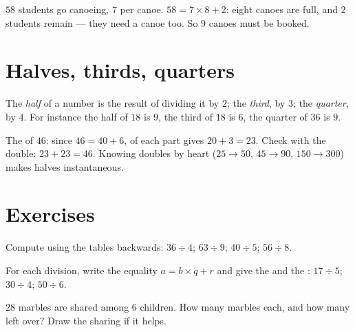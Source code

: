 \begin{example}\label{ex:g3:division:interpret}
$58$ students go canoeing, $7$ per canoe. $58 = 7 \times 8 + 2$:
eight canoes are full, and $2$ students remain --- they need a canoe
too. So $9$ canoes must be booked.
\end{example}

\section{Halves, thirds, quarters}

\begin{definition}\label{def:g3:division:half}
The \emph{half} of a number is the result of dividing it by $2$; the
\emph{third}, by $3$; the \emph{quarter}, by $4$. For instance the
half of $18$ is $9$, the third of $18$ is $6$, the quarter of $36$
is $9$.
\end{definition}

\begin{example}\label{ex:g3:division:double}
The  of $46$: since $46 = 40 + 6$,  of each part gives
$20 + 3 = 23$. Check with the double: $23 + 23 = 46$. Knowing
doubles by heart ($25 \to 50$, $45 \to 90$, $150 \to 300$) makes
halves instantaneous.
\end{example}

\section{Exercises}

\begin{exercise}[$\star$]\label{exo:g3:division:1}
Compute using the tables backwards: $36 \div 4$; \quad $63 \div 9$;
\quad $40 \div 5$; \quad $56 \div 8$.
\end{exercise}

\begin{exercise}[$\star$]\label{exo:g3:division:2}
For each division, write the equality $a = b \times q + r$ and give
the  and the : $17 \div 5$; \quad $30 \div 4$; \quad
$50 \div 6$.
\end{exercise}

\begin{exercise}[$\star$]\label{exo:g3:division:3}
$28$ marbles are shared among $6$ children. How many marbles each,
and how many left over? Draw the sharing if it helps.
\end{exercise}

